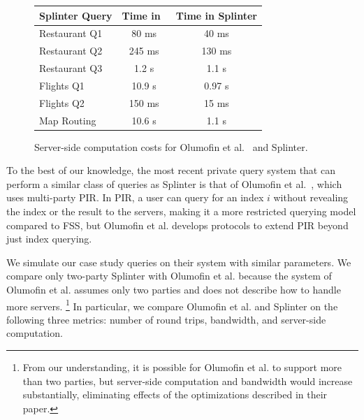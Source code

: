 
\begin{figure}
	\centering
	\begin{tabular}{lcc}
		\toprule
		\bf Splinter Query & \bf Time in~\cite{goldberg} & \bf Time in Splinter \\
		\midrule
		Restaurant Q1 & 80 ms & 40 ms \\
		\midrule
		Restaurant Q2 & 245 ms & 130 ms \\ 
		\midrule
		Restaurant Q3 & 1.2 s & 1.1 s \\
		\midrule
		Flights Q1 & 10.9 s & 0.97 s \\
		\midrule
		Flights Q2 & 150 ms & 15 ms \\
		\midrule
		Map Routing & 10.6 s & 1.1 s \\
		\bottomrule
	\end{tabular}
	\caption{Server-side computation costs for Olumofin et al.~\cite{goldberg} and Splinter.}
	\label{fig:serverside-comparison}
\end{figure}

To the best of our knowledge, the most recent
private query system that can perform a similar class of queries
as Splinter is that of Olumofin et al.~\cite{goldberg},
which uses multi-party PIR. In PIR, a user can query for an index $i$
without revealing the index or the result to the servers, making 
it a more restricted querying model compared to FSS, but Olumofin et al.
develops protocols to extend PIR beyond just index querying. 

We simulate our case study queries 
on their system with similar parameters.
We compare only two-party Splinter with Olumofin et al.
because the system of Olumofin et al. assumes only two parties 
and does not describe how to handle more servers.
\footnote{From our understanding, it is possible for Olumofin et al. to support
	more than two parties, but server-side computation and bandwidth would increase
	substantially, eliminating effects of the optimizations described in their paper.}
In particular, we compare Olumofin et al. and Splinter on
the following three metrics: number of  
round trips, bandwidth, and server-side computation. 

